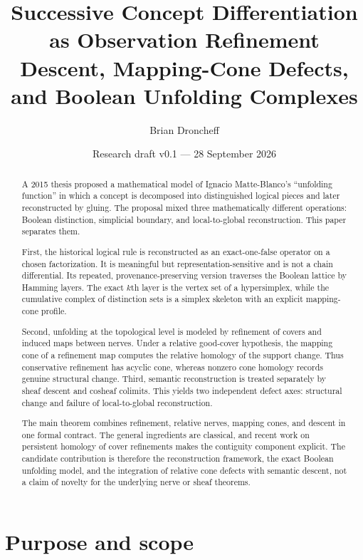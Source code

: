 \documentclass[11pt]{article}
\title{\textbf{Successive Concept Differentiation as Observation Refinement}\\
\large Descent, Mapping-Cone Defects, and Boolean Unfolding Complexes}
\author{Brian Droncheff}
\date{Research draft v0.1 --- 28 September 2026}
\begin{document}
\maketitle

\begin{abstract}
A 2015 thesis proposed a mathematical model of Ignacio Matte-Blanco's ``unfolding function'' in which a concept is decomposed into distinguished logical pieces and later reconstructed by gluing.  The proposal mixed three mathematically different operations: Boolean distinction, simplicial boundary, and local-to-global reconstruction.  This paper separates them.

First, the historical logical rule is reconstructed as an exact-one-false operator on a chosen factorization.  It is meaningful but representation-sensitive and is not a chain differential.  Its repeated, provenance-preserving version traverses the Boolean lattice by Hamming layers.  The exact $k$th layer is the vertex set of a hypersimplex, while the cumulative complex of distinction sets is a simplex skeleton with an explicit mapping-cone profile.

Second, unfolding at the topological level is modeled by refinement of covers and induced maps between nerves.  Under a relative good-cover hypothesis, the mapping cone of a refinement map computes the relative homology of the support change.  Thus conservative refinement has acyclic cone, whereas nonzero cone homology records genuine structural change.  Third, semantic reconstruction is treated separately by sheaf descent and cosheaf colimits.  This yields two independent defect axes: structural change and failure of local-to-global reconstruction.

The main theorem combines refinement, relative nerves, mapping cones, and descent in one formal contract.  The general ingredients are classical, and recent work on persistent homology of cover refinements makes the contiguity component explicit.  The candidate contribution is therefore the reconstruction framework, the exact Boolean unfolding model, and the integration of relative cone defects with semantic descent, not a claim of novelty for the underlying nerve or sheaf theorems.
\end{abstract}

\tableofcontents

\section{Purpose and scope}
\end{document}
